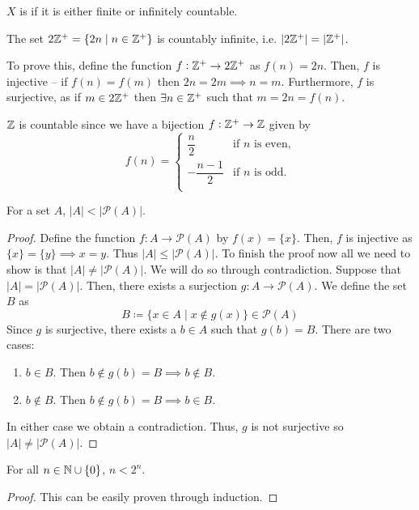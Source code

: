 \begin{definition}
$X$ is  if it is either finite or infinitely countable.
\end{definition}

\begin{example}
The set $2\mathbb Z^+=\{2n \mid n \in \mathbb Z^+\}$ is countably infinite, i.e. $|2\mathbb Z^+|=|\mathbb Z^+|$. 

To prove this, define the function $f:\mathbb Z^+\to2\mathbb Z^+$ as $f(n)=2n$. Then, $f$ is injective -- if $f(n) = f(m)$ then $2n=2m \implies n=m$. Furthermore, $f$ is surjective, as if $m\in2\mathbb Z^+$ then $\exists n \in \mathbb Z^+$ such that $m=2n=f(n)$.
\end{example}

\begin{example}
$\mathbb Z$ is countable since we have a bijection $f:\mathbb Z^+\to\mathbb Z$ given by
\[ f(n)=\begin{cases}
    \dfrac{n}{2} & \text{if }n\text{ is even,} \\[1ex]
    -\dfrac{n-1}{2} & \text{if }n\text{ is odd.} \\
\end{cases} \]
\end{example}



\begin{theorem}[Cantor]
For a set $A$, $|A|<|\mathcal{P}(A)|$.
\end{theorem}
\begin{proof}
Define the function $f:A \to \mathcal{P}(A)$ by $f(x) = \{x\}$. Then, $f$ is injective as $\{x\}=\{y\} \implies x=y$. Thus $|A| \le |\mathcal{P}(A)|$. To finish the proof now all we need to show is that $|A| \neq |\mathcal{P}(A)|$. We will do so through contradiction. Suppose that $|A| = |\mathcal{P}(A)|$. Then, there exists a surjection $g:A \to \mathcal{P}(A)$. We define the set $B$ as
\[ B \coloneq \{x \in A \mid x \notin g(x)\} \in \mathcal{P}(A) \]
Since $g$ is surjective, there exists a $b \in A$ such that $g(b) = B$. There are two cases:
\begin{enumerate}
\item $b \in B$. Then $b \notin g(b) = B \implies b \notin B$.
\item $b \notin B$. Then $b \notin g(b) = B \implies b \in B$.
\end{enumerate}
In either case we obtain a contradiction. Thus, $g$ is not surjective so $|A| \neq |\mathcal{P}(A)|$.
\end{proof}

\begin{corollary}
For all $n \in \mathbb N \cup \{0\}$, $n<2^n$.
\end{corollary}
\begin{proof}
This can be easily proven through induction.
\end{proof}
\pagebreak

